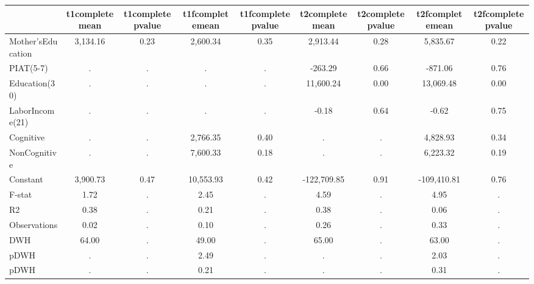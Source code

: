 \begin{table}[htbp]
\begin{tabular}{lcccccccc} \hline \hline
 & t1completemean  & t1completepvalue  & t1fcompletemean  & t1fcompletepvalue  & t2completemean  & t2completepvalue  & t2fcompletemean  & t2fcompletepvalue  \\  \hline 
Mother'sEducation &     3,134.16 &         0.23 &     2,600.34 &         0.35 &     2,913.44 &         0.28 &     5,835.67 &         0.22 \\  
PIAT(5-7) &            . &            . &            . &            . &      -263.29 &         0.66 &      -871.06 &         0.76 \\  
Education(30) &            . &            . &            . &            . &    11,600.24 &         0.00 &    13,069.48 &         0.00 \\  
LaborIncome(21) &            . &            . &            . &            . &        -0.18 &         0.64 &        -0.62 &         0.75 \\  
Cognitive &            . &            . &     2,766.35 &         0.40 &            . &            . &     4,828.93 &         0.34 \\  
NonCognitive &            . &            . &     7,600.33 &         0.18 &            . &            . &     6,223.32 &         0.19 \\  
Constant &     3,900.73 &         0.47 &    10,553.93 &         0.42 &  -122,709.85 &         0.91 &  -109,410.81 &         0.76 \\  
F-stat &         1.72 &            . &         2.45 &            . &         4.59 &            . &         4.95 &            . \\  
R2 &         0.38 &            . &         0.21 &            . &         0.38 &            . &         0.06 &            . \\  
Observations &         0.02 &            . &         0.10 &            . &         0.26 &            . &         0.33 &            . \\  
DWH &        64.00 &            . &        49.00 &            . &        65.00 &            . &        63.00 &            . \\  
pDWH &            . &            . &         2.49 &            . &            . &            . &         2.03 &            . \\  
pDWH &            . &            . &         0.21 &            . &            . &            . &         0.31 &            . \\  
\hline \hline \end{tabular}
\end{table}
